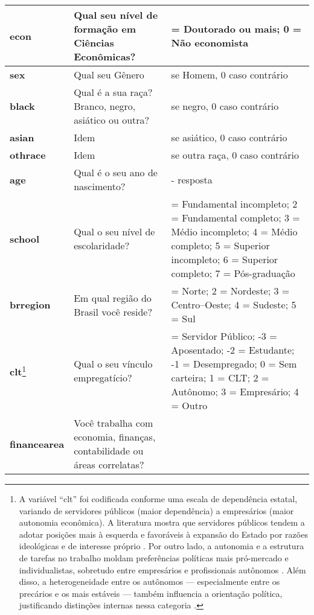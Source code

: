 \begin{anexosenv}
\begin{longtable}{|>{\raggedright\arraybackslash}p{4cm} 
                  |>{\raggedright\arraybackslash}p{8cm} 
                  |>{\raggedright\arraybackslash}p{4cm}|}
    \textbf{econ} & Qual seu nível de formação em Ciências Econômicas? & 
    1 = Doutorado ou mais; 0 = Não economista \\ 
    \hline
    \textbf{sex} & Qual seu Gênero & 
    1 se Homem, 0 caso contrário \\ 
    \hline
    \textbf{black} & Qual é a sua raça? Branco, negro, asiático ou outra? & 1 se negro, 0 caso contrário \\ 
    \hline
    \textbf{asian} & Idem & 1 se asiático, 0 caso contrário \\ 
    \hline
    \textbf{othrace} & Idem & 1 se outra raça, 0 caso contrário \\   \hline
    \textbf{age} & Qual é o seu ano de nascimento? & 
    2025 - resposta \\
    \hline
    \textbf{school} & Qual o seu nível de escolaridade? & 
    1 = Fundamental incompleto; 
    2 = Fundamental completo; 
    3 = Médio incompleto; 
    4 = Médio completo; 
    5 = Superior incompleto; 
    6 = Superior completo; 
    7 = Pós-graduação \\ 
    \hline
    \textbf{brregion} & Em qual região do Brasil você reside? & 
    1 = Norte; 
    2 = Nordeste; 
    3 = Centro--Oeste; 
    4 = Sudeste; 
    5 = Sul \\ 
    \hline
    \textbf{clt}\footnote{A variável ``clt'' foi codificada conforme uma escala de dependência estatal, variando de servidores públicos (maior dependência) a empresários (maior autonomia econômica). A literatura mostra que servidores públicos tendem a adotar posições mais à esquerda e favoráveis à expansão do Estado por razões ideológicas e de interesse próprio \cite{jensen2009political}. Por outro lado, a autonomia e a estrutura de tarefas no trabalho moldam preferências políticas mais pró-mercado e individualistas, sobretudo entre empresários e profissionais autônomos \cite{kitschelt2014occupations}. Além disso, a heterogeneidade entre os autônomos — especialmente entre os precários e os mais estáveis — também influencia a orientação política, justificando distinções internas nessa categoria \cite{jansen2016self}.}  & Qual o seu vínculo empregatício? & 
    -4 = Servidor Público;  
    -3 = Aposentado;        
    -2 = Estudante;         
    -1 = Desempregado;      
    0 = Sem carteira;      
    1 = CLT;               
    2 = Autônomo;          
    3 = Empresário;        
    4 = Outro             
    \\ 
    \hline
    \textbf{financearea} & Você trabalha com economia, finanças, contabilidade ou áreas correlatas? & 

\end{longtable}
\end{anexosenv}
